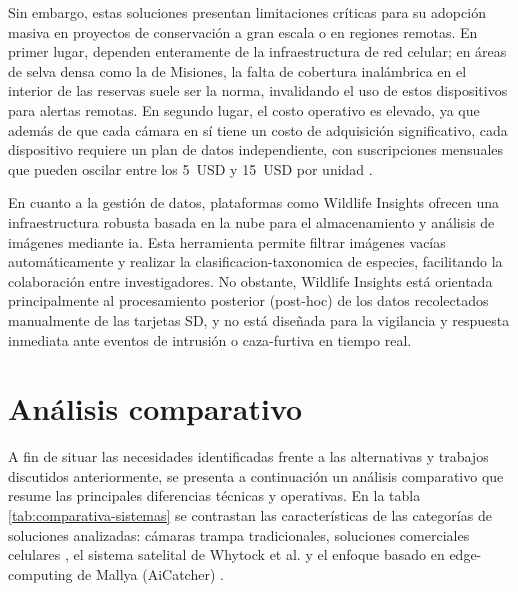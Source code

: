 \documentclass[a4paper, 12pt]{report}
\begin{document}
Sin embargo, estas soluciones presentan limitaciones críticas para su adopción
masiva en proyectos de conservación a gran escala o en regiones remotas. En
primer lugar, dependen enteramente de la infraestructura de red celular; en
áreas de selva densa como la de Misiones, la falta de cobertura inalámbrica
en el interior de las reservas suele ser la norma, invalidando el uso de estos
dispositivos para alertas remotas. En segundo lugar, el costo operativo es
elevado, ya que además de que cada cámara en sí tiene un costo de adquisición
significativo, cada dispositivo requiere un plan de datos independiente, con
suscripciones mensuales que pueden oscilar entre los \qty{5}{USD} y \qty{15}{USD} por unidad
\cite{tactacam2024reveal, spypoint2024cellular}.

En cuanto a la gestión de datos, plataformas como Wildlife Insights
\cite{wildlifeinsights2024} ofrecen una infraestructura robusta basada en la
nube para el almacenamiento y análisis de imágenes mediante \gls{ia}. Esta
herramienta permite filtrar imágenes vacías automáticamente y realizar la
\gls{clasificacion-taxonomica} de especies, facilitando la colaboración entre
investigadores. No obstante, Wildlife Insights está orientada principalmente al
procesamiento posterior (post-hoc) de los datos recolectados manualmente de las
tarjetas SD, y no está diseñada para la vigilancia y respuesta inmediata ante
eventos de intrusión o \gls{caza-furtiva} en tiempo real.

\section{Análisis comparativo}

A fin de situar las necesidades identificadas frente a las alternativas y
trabajos discutidos anteriormente, se presenta a continuación un análisis
comparativo que resume las principales diferencias técnicas y operativas. En la
tabla \ref{tab:comparativa-sistemas} se contrastan las características de las
categorías de soluciones analizadas: cámaras trampa tradicionales, soluciones
comerciales celulares \cite{tactacam2024reveal, spypoint2024cellular}, el
sistema satelital de Whytock et al. \cite{whytock2023iridium} y el enfoque
basado en \gls{edge-computing} de Mallya (AiCatcher) \cite{mallya2019aicatcher}.
\end{document}
